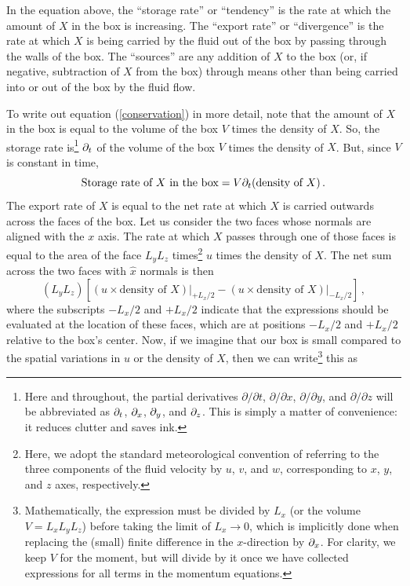 \documentclass[12pt]{article}
\begin{document}
In the equation above, the ``storage rate'' or ``tendency'' is the rate at which the amount of $X$ in the box is increasing.  The ``export rate'' or ``divergence'' is the rate at which $X$ is being carried by the fluid out of the box by passing through the walls of the box.  The ``sources'' are any addition of $X$ to the box (or, if negative, subtraction of $X$ from the box) through means other than being carried into or out of the box by the fluid flow.


To write out equation (\ref{conservation}) in more detail, note that the amount of $X$ in the box is equal to the volume of the box $V$ times the density of $X$.  So, the storage rate is\footnote{Here and throughout, the partial derivatives $\partial/\partial t$, $\partial/\partial x$, $\partial/\partial y$, and $\partial/\partial z$ will be abbreviated as $\partial_t$, $\partial_x$, $\partial_y$, and $\partial_z$.  This is simply a matter of convenience: it reduces clutter and saves ink.} $\partial_t$ of the volume of the box $V$ times the density of $X$.  But, since $V$ is constant in time,
\[
\text{Storage rate of $X$ in the box} = V \partial_t (\text{density of $X$}) \, .
\]
The export rate of $X$ is equal to the net rate at which $X$ is carried outwards across the faces of the box.  Let us consider the two faces whose normals are aligned with the $x$ axis. The rate at which $X$ passes through one of those faces is equal to the area of the face $L_y L_z$ times\footnote{Here, we adopt the standard meteorological convention of referring to the three components of the fluid velocity by $u$, $v$, and $w$, corresponding to $x$, $y$, and $z$ axes, respectively.} $u$ times the density of $X$.  The net sum across the two faces with $\hat{x}$ normals is then
\[
(L_y L_z) \left[ \left.(u \times\text{density of $X$})\right|_{+L_x/2} - \left.(u\times\text{density of $X$})\right|_{-L_x/2} \right] \, ,
\]
where the subscripts $-L_x/2$ and $+L_x/2$ indicate that the expressions should be evaluated at the location of these faces, which are at positions $-L_x/2$ and $+L_x/2$ relative to the box's center.  Now, if we imagine that our box is small compared to the spatial variations in $u$ or the density of $X$, then we can write\footnote{Mathematically, the expression must be divided by $L_x$ (or the volume $V=L_x L_y L_z$) before taking the limit of $L_x \rightarrow 0$, which is implicitly done when replacing the (small) finite difference in the $x$-direction by $\partial_x$. For clarity, we keep $V$ for the moment, but will divide by it once we have collected expressions for all terms in the momentum equations.} this as
\end{document}
